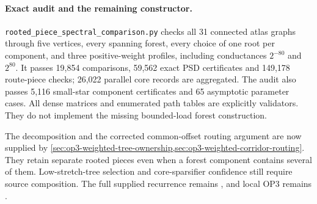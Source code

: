 \paragraph{Exact audit and the remaining constructor.}
\texttt{rooted\_piece\_spectral\_comparison.py} checks all 31 connected
atlas graphs through five vertices, every spanning forest, every choice
of one root per component, and three positive-weight profiles, including
conductances $2^{-80}$ and $2^{80}$. It passes 19,854 comparisons,
59,562 exact PSD certificates and 149,178 route-piece checks; 26,022
parallel core records are aggregated. The audit also passes 5,116
small-star component certificates and 65 asymptotic parameter cases.
All dense matrices and enumerated path tables are explicitly validators.
They do not implement the missing bounded-load forest construction.

The decomposition and the corrected common-offset routing argument are
now supplied by
\cref{sec:op3-weighted-tree-ownership,sec:op3-weighted-corridor-routing}.
They retain separate rooted pieces even when a forest component contains
several of them. Low-stretch-tree selection and core-sparsifier confidence
still require source composition. The full supplied recurrence remains
\statusconditional, and local OP3 remains \statusopen.
